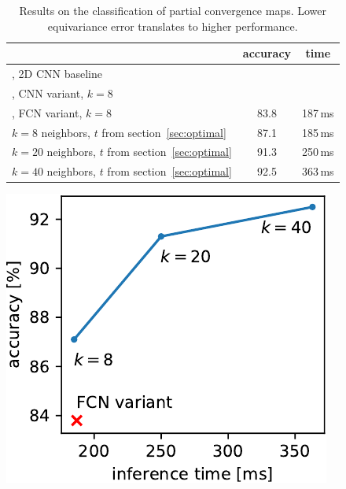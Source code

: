 \documentclass{article} %
\newcommand{\todo}[1]{{\color[rgb]{.6,.1,.6}{#1}}}
\newcommand{\secref}[1]{section~\ref{sec:#1}}
\begin{document}
\begin{table}
	\begin{minipage}[b]{0.7\linewidth}
    \centering
    \begin{tabular}{l c c}
		\toprule
		& accuracy & time \\ %
		\midrule
		\citet{perraudin2019deepspherecosmo}, 2D CNN baseline & \todo{??} & \todo{??} \\
		\citet{perraudin2019deepspherecosmo}, CNN variant, $k=8$ & \todo{??} & \todo{??} \\
		\citet{perraudin2019deepspherecosmo}, FCN variant, $k=8$ & 83.8 & 187\,ms \\ %
		$k=8$  neighbors, $t$ from \secref{optimal} & 87.1 & 185\,ms \\ %
		$k=20$ neighbors, $t$ from \secref{optimal} & 91.3 & 250\,ms \\ %
		$k=40$ neighbors, $t$ from \secref{optimal} & 92.5 & 363\,ms \\ %
		\bottomrule
    \end{tabular}
	\caption{
		Results on the classification of partial convergence maps.
		Lower equivariance error translates to higher performance.
	} \label{tab:cosmo}
	\end{minipage} \hfill
	\begin{minipage}[b]{0.25\linewidth}
		\includegraphics[width=\linewidth]{cosmo_cost_accuracy_tradeoff}
		\label{fig:cosmo:tradeoff}
	\end{minipage}
\end{table}
\end{document}
